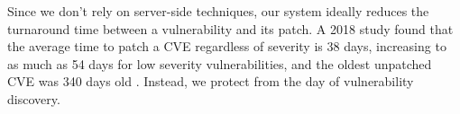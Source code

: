 Since we don't rely on server-side techniques, our system ideally reduces the turnaround time between a vulnerability and its patch. A 2018 study found that the average time to patch a CVE regardless of severity is 38 days, increasing to as much as 54 days for low severity vulnerabilities, and the oldest unpatched CVE was 340 days old \cite{Rapid7}. Instead, we protect from the day of vulnerability discovery.

